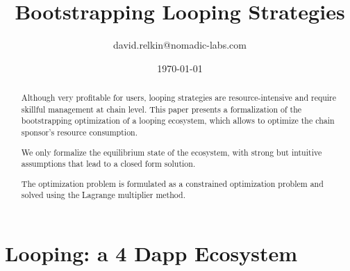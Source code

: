 \documentclass{article}
\begin{document}
\setlength{\parindent}{0pt}

\title{Bootstrapping Looping Strategies}
\author{david.relkin@nomadic-labs.com}
\date{\today}
\maketitle

\begin{abstract}
    Although very profitable for users, looping strategies are resource-intensive and require skillful management at chain level.
    This paper presents a formalization of the bootstrapping optimization of a looping ecosystem, which allows to optimize the chain sponsor's resource consumption.

We only formalize the equilibrium state of the ecosystem, with strong but intuitive assumptions that lead to a closed form solution.
    
    The optimization problem is formulated as a constrained optimization problem and solved using the Lagrange multiplier method.
\end{abstract}

\section{Looping: a 4 Dapp Ecosystem}
\end{document}

